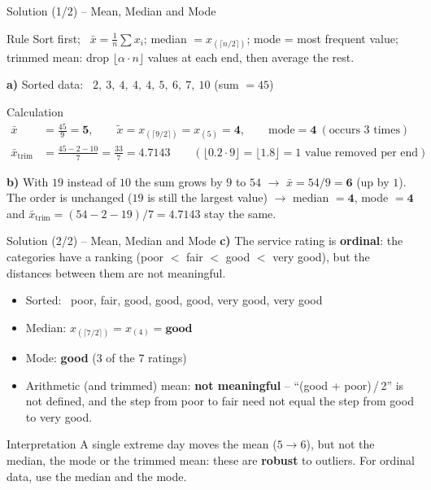 \documentclass[aspectratio=169,11pt]{beamer}
\begin{document}
\begin{frame}{Solution (1/2) -- Mean, Median and Mode}
  \begin{block}{Rule}
    Sort first; \ $\bar{x} = \frac{1}{n}\sum x_i$; \quad median $= x_{(\lceil n/2 \rceil)}$; \quad
    mode = most frequent value;\\ trimmed mean: drop $\lfloor \alpha \cdot n \rfloor$ values at each
    end, then average the rest.
  \end{block}
  \textbf{a)} Sorted data: \ $2,\ 3,\ 4,\ 4,\ 4,\ 5,\ 6,\ 7,\ 10$ \qquad (sum $= 45$)
  \begin{exampleblock}{Calculation}
    \vspace{-0.3cm}
    \begin{align*}
      \bar{x} &= \frac{45}{9} = \mathbf{5}, \qquad
      \tilde{x} = x_{(\lceil 9/2 \rceil)} = x_{(5)} = \mathbf{4}, \qquad
      \text{mode} = \mathbf{4} \ (\text{occurs 3 times}) \\[2pt]
      \bar{x}_{\text{trim}} &= \frac{45 - 2 - 10}{7} = \frac{33}{7} = \mathbf{4.7143}
      \qquad (\lfloor 0.2 \cdot 9 \rfloor = \lfloor 1.8 \rfloor = 1 \text{ value removed per end})
    \end{align*}
  \end{exampleblock}
  \textbf{b)} With $19$ instead of $10$ the sum grows by $9$ to $54$ $\to$
  $\bar{x} = 54 / 9 = \mathbf{6}$ (up by $1$). The order is unchanged ($19$ is still the
  largest value) $\to$ median $= \mathbf{4}$, mode $= \mathbf{4}$ and
  $\bar{x}_{\text{trim}} = (54 - 2 - 19) / 7 = \mathbf{4.7143}$ stay the same.
\end{frame}

\begin{frame}{Solution (2/2) -- Mean, Median and Mode}
  \textbf{c)} The service rating is \textbf{ordinal}: the categories have a ranking
  (poor $<$ fair $<$ good $<$ very good), but the distances between them are not meaningful.
  \begin{itemize}
    \item Sorted: \ poor, fair, good, good, good, very good, very good
    \item Median: $x_{(\lceil 7/2 \rceil)} = x_{(4)} = \textbf{good}$
    \item Mode: \textbf{good} (3 of the 7 ratings)
    \item Arithmetic (and trimmed) mean: \textbf{not meaningful} -- ``(good + poor)\,/\,2'' is not
      defined, and the step from poor to fair need not equal the step from good to very good.
  \end{itemize}
  \begin{alertblock}{Interpretation}
    A single extreme day moves the mean ($5 \to 6$), but not the median, the mode or the trimmed
    mean: these are \textbf{robust} to outliers. For ordinal data, use the median and the mode.
  \end{alertblock}
\end{frame}
\end{document}
